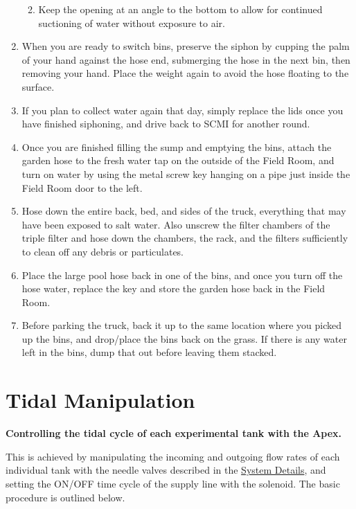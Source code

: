 \documentclass[
]{book}
\providecommand{\tightlist}{%
  \setlength{\itemsep}{0pt}\setlength{\parskip}{0pt}}
\begin{document}
\begin{enumerate}
  \begin{enumerate}
  \def\labelenumii{\arabic{enumii}.}
  \tightlist
  \item
    Keep the opening at an angle to the bottom to allow for continued suctioning of water without exposure to air.
  \end{enumerate}
\item
  When you are ready to switch bins, preserve the siphon by cupping the palm of your hand against the hose end, submerging the hose in the next bin, then removing your hand. Place the weight again to avoid the hose floating to the surface.
\item
  If you plan to collect water again that day, simply replace the lids once you have finished siphoning, and drive back to SCMI for another round.
\item
  Once you are finished filling the sump and emptying the bins, attach the garden hose to the fresh water tap on the outside of the Field Room, and turn on water by using the metal screw key hanging on a pipe just inside the Field Room door to the left.
\item
  Hose down the entire back, bed, and sides of the truck, everything that may have been exposed to salt water. Also unscrew the filter chambers of the triple filter and hose down the chambers, the rack, and the filters sufficiently to clean off any debris or particulates.
\item
  Place the large pool hose back in one of the bins, and once you turn off the hose water, replace the key and store the garden hose back in the Field Room.
\item
  Before parking the truck, back it up to the same location where you picked up the bins, and drop/place the bins back on the grass. If there is any water left in the bins, dump that out before leaving them stacked.
\end{enumerate}

\hypertarget{tidal-manipulation}{%
\chapter{Tidal Manipulation}\label{tidal-manipulation}}

\textbf{Controlling the tidal cycle of each experimental tank with the Apex.}

This is achieved by manipulating the incoming and outgoing flow rates of each individual tank with the needle valves described in the \protect\hyperlink{system-details}{System Details}, and setting the ON/OFF time cycle of the supply line with the solenoid. The basic procedure is outlined below.
\end{document}

